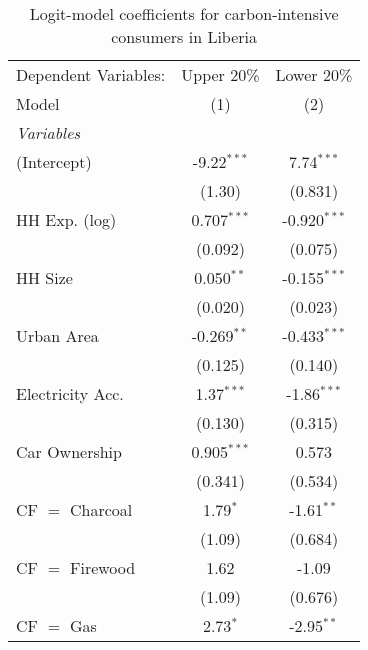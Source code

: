 
\begin{table}[htbp!]
   \centering
   \small
   \begin{adjustbox}{width = 1\textwidth, max height = 0.95\textheight, center}
      \begin{threeparttable}[b]
         \caption{\label{tab:Logit_1_LBR} Logit-model coefficients for carbon-intensive consumers in Liberia}
         \begin{tabular}{lcc}
            \tabularnewline \midrule \midrule
            Dependent Variables: & Upper 20\%    & Lower 20\%\\   
            Model                & (1)           & (2)\\  
            \midrule
            \emph{Variables}\\
            (Intercept)          & -9.22$^{***}$ & 7.74$^{***}$\\   
                                 & (1.30)        & (0.831)\\   
            HH Exp. (log)        & 0.707$^{***}$ & -0.920$^{***}$\\   
                                 & (0.092)       & (0.075)\\   
            HH Size              & 0.050$^{**}$  & -0.155$^{***}$\\   
                                 & (0.020)       & (0.023)\\   
            Urban Area           & -0.269$^{**}$ & -0.433$^{***}$\\   
                                 & (0.125)       & (0.140)\\   
            Electricity Acc.     & 1.37$^{***}$  & -1.86$^{***}$\\   
                                 & (0.130)       & (0.315)\\   
            Car Ownership        & 0.905$^{***}$ & 0.573\\   
                                 & (0.341)       & (0.534)\\   
            CF $=$ Charcoal      & 1.79$^{*}$    & -1.61$^{**}$\\   
                                 & (1.09)        & (0.684)\\   
            CF $=$ Firewood      & 1.62          & -1.09\\   
                                 & (1.09)        & (0.676)\\   
            CF $=$ Gas           & 2.73$^{*}$    & -2.95$^{**}$\\   

\end{tabular}
\end{threeparttable}
\end{adjustbox}
\end{table}
